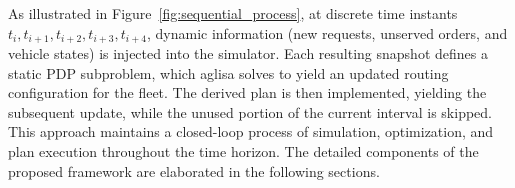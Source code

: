 \documentclass[pdflatex]{sn-jnl}
\begin{document}
As illustrated in Figure~\ref{fig:sequential_process}, at discrete time instants \( t_i, t_{i+1}, t_{i+2}, t_{i+3}, t_{i+4} \), dynamic information (new requests, unserved orders, and vehicle states) is injected into the simulator. Each resulting snapshot defines a static PDP subproblem, which \gls{aglisa} solves to yield an updated routing configuration for the fleet. 
The derived plan is then implemented, yielding the subsequent update, while the unused portion of the current interval is skipped. This approach maintains a closed-loop process of simulation, optimization, and plan execution throughout the time horizon. The detailed components of the proposed framework are elaborated in the following sections.



\end{document}
